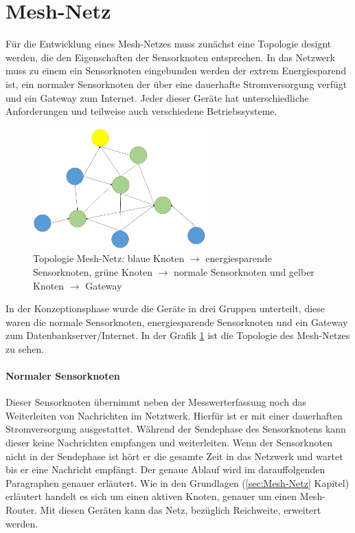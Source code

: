 \section{Mesh-Netz}
\label{sec:KonzeptionMeshNetz}
Für die Entwicklung eines Mesh-Netzes muss zunächst eine Topologie designt werden, die den Eigenschaften der Sensorknoten entsprechen. In das Netzwerk muss zu einem ein Sensorknoten eingebunden werden der extrem Energiesparend ist, ein normaler Sensorknoten der über eine dauerhafte Stromversorgung verfügt und ein Gateway zum Internet. Jeder dieser Geräte hat unterschiedliche Anforderungen und teilweise auch verschiedene Betriebssysteme. 
\begin{figure}
	\centering
	\includegraphics[width=0.6\textwidth]{bilder/konzeptionMeshTopologie.png}
	\caption[Topologie Mesh-Netz]{Topologie Mesh-Netz: blaue Knoten $\rightarrow$ energiesparende Sensorknoten, grüne Knoten $\rightarrow$ normale Sensorknoten und gelber Knoten $\rightarrow$ Gateway}
	\label{img:konzeptionTopologie}
\end{figure}

In der Konzeptionsphase wurde die Geräte in drei Gruppen unterteilt, diese waren die normale Sensorknoten, energiesparende Sensorknoten und ein Gateway zum Datenbankserver/Internet. In der Grafik \ref{img:konzeptionTopologie} ist die Topologie des Mesh-Netzes zu sehen.
\paragraph{Normaler Sensorknoten} Dieser Sensorknoten übernimmt neben der Messwerterfassung noch das Weiterleiten von Nachrichten im Netztwerk. Hierfür ist er mit einer dauerhaften Stromversorgung ausgestattet. Während der Sendephase des Sensorknotens kann dieser keine Nachrichten empfangen und weiterleiten. Wenn der Sensorknoten nicht in der Sendephase ist hört er die gesamte Zeit in das Netzwerk und wartet bis er eine Nachricht empfängt. Der genaue Ablauf wird im darauffolgenden Paragraphen genauer erläutert. Wie in den Grundlagen (\ref{sec:Mesh-Netz} Kapitel) erläutert handelt es sich um einen aktiven Knoten, genauer um einen Mesh-Router. Mit diesen Geräten kann das Netz, bezüglich Reichweite, erweitert werden.

